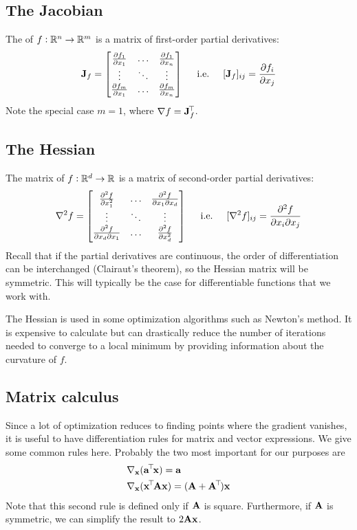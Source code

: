 \subsection{The Jacobian}
The  of $f : \mathbb{R}^n \to \mathbb{R}^m$ is a matrix of first-order partial derivatives:
\[\mathbf{J}_f = \begin{bmatrix}
	\pdv{f_1}{x_1} & \hdots & \pdv{f_1}{x_n} \\
	\vdots & \ddots & \vdots \\
	\pdv{f_m}{x_1} & \hdots & \pdv{f_m}{x_n}\end{bmatrix}
\hspace{0.5cm}\text{i.e.}\hspace{0.5cm}
[\mathbf{J}_f]_{ij} = \pdv{f_i}{x_j}\]
Note the special case $m = 1$, where $\nabla f = \mathbf{J}_f^{\!\top\!}$.

\subsection{The Hessian}
The  matrix of $f : \mathbb{R}^d \to \mathbb{R}$ is a matrix of second-order partial derivatives:
\[\nabla^2 f = \begin{bmatrix}
	\pdv[2]{f}{x_1} & \hdots & \pdv{f}{x_1}{x_d} \\
	\vdots & \ddots & \vdots \\
	\pdv{f}{x_d}{x_1} & \hdots & \pdv[2]{f}{x_d}\end{bmatrix}
\hspace{0.5cm}\text{i.e.}\hspace{0.5cm}
[\nabla^2 f]_{ij} = {\pdv{f}{x_i}{x_j}}\]
Recall that if the partial derivatives are continuous, the order of differentiation can be interchanged (Clairaut's theorem), so the Hessian matrix will be symmetric.
This will typically be the case for differentiable functions that we work with.

The Hessian is used in some optimization algorithms such as Newton's method.
It is expensive to calculate but can drastically reduce the number of iterations needed to converge to a local minimum by providing information about the curvature of $f$.

\subsection{Matrix calculus}
Since a lot of optimization reduces to finding points where the gradient vanishes, it is useful to have differentiation rules for matrix and vector expressions.
We give some common rules here.
Probably the two most important for our purposes are
\begin{align*}
\nabla_{\mathbf{x}} &(\mathbf{a}^{\!\top\!}\mathbf{x}) = \mathbf{a} \\
\nabla_{\mathbf{x}} &(\mathbf{x}^{\!\top\!}\mathbf{A}\mathbf{x}) = (\mathbf{A} + \mathbf{A}^{\!\top\!})\mathbf{x}
\end{align*}
Note that this second rule is defined only if $\mathbf{A}$ is square.
Furthermore, if $\mathbf{A}$ is symmetric, we can simplify the result to $2\mathbf{A}\mathbf{x}$.


